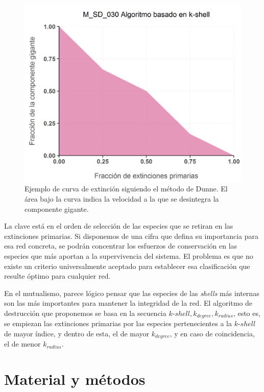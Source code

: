 \begin{figure}[h!]
\centering
\includegraphics[scale=0.55]{Figures/ESTATICA_destruction_example.png}
\caption{Ejemplo de curva de extinción siguiendo el método de Dunne. El área bajo la curva indica la velocidad a la que se desintegra la componente gigante.}
\label{fig:ESTATICA_destruction_example}
\end{figure}

La clave está en el orden de selección de las especies que se retiran en las extinciones primarias. Si disponemos de una cifra que defina su importancia para esa red concreta, se podrán concentrar los esfuerzos de conservación en las especies que más aportan a la supervivencia del sistema. El problema es que no existe un criterio universalmente aceptado para establecer esa clasificación que resulte óptimo para cualquier red.

En el mutualismo, parece lógico pensar que las especies de las \textit{shells} más internas son las más importantes para mantener la integridad de la red. El algoritmo de destrucción que proponemos se basa en la secuencia $k$-$shell, k_{degree}, k_{radius}$, esto es, se empiezan las extinciones primarias por las especies pertenecientes a la $k$-$shell$ de mayor índice, y dentro de esta, el de mayor $k_{degree}$, y en caso de coincidencia, el de menor $k_{radius}$. 

\section{Material y métodos}

